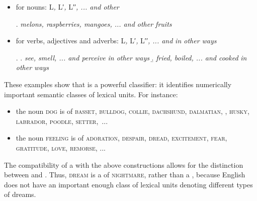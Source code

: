 \begin{itemize}

\item for nouns: L\textit{,} L′\textit{,} L′′\textit{, ... and other}  

\begingroup
\small

\ex. \textit{melons, raspberries, mangoes, ... and other fruits}

\endgroup

\item for verbs, adjectives and adverbs: L\textit{,} L′\textit{,} L′′\textit{, ... and}  \textit{in other ways}

\begingroup
\small

\ex. \a. \textit{see, smell, ... and perceive} \textit{in other ways}
     \b. \textit{fried, boiled, ... and cooked} \textit{in other ways}

\endgroup

\end{itemize}

These examples show that  is a powerful classifier: it identifies numerically important semantic classes of lexical units. For instance:

\begin{itemize}

\item the noun \textsc{dog} is  of \textsc{basset}, \textsc{bulldog}, \textsc{collie}, \textsc{dachshund}, \textsc{dalmatian}, , \textsc{husky}, \textsc{labrador}, \textsc{poodle}, \textsc{setter},~...
    
\item the noun \textsc{feeling} is  of \textsc{adoration}, \textsc{despair}, \textsc{dread}, \textsc{excitement}, \textsc{fear}, \textsc{gratitude}, \textsc{love}, \textsc{remorse}, ...

\end{itemize}

The compatibility of a  with the above constructions allows for the distinction between  and \tsub{$\subset$}. Thus, \textsc{dream} is a \tsub{$\subset$} of \textsc{nightmare}, rather than a , because English does not have an important enough class of lexical units denoting different types of dreams.

